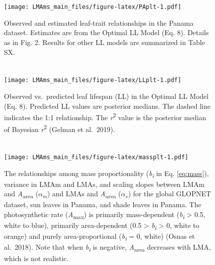 \documentclass[
  12pt,
]{article}
\begin{document}
\newpage

\hypertarget{section-3}{%
\section{}\label{section-3}}

\begin{figure}
\centering
\texttt{[image: LMAms\_main\_files/figure-latex/PAplt-1.pdf]}
\caption{\label{fig:PAplt}Observed and estimated leaf-trait relationships in the Panama dataset. Estimates are from the Optimal LL Model (Eq. 8). Details as in Fig. 2. Results for other LL models are summarized in Table SX.}
\end{figure}

\newpage

\hypertarget{section-4}{%
\section{}\label{section-4}}

\begin{figure}
\centering
\texttt{[image: LMAms\_main\_files/figure-latex/LLplt-1.pdf]}
\caption{\label{fig:LLplt}Observed vs.~predicted leaf lifespan (LL) in the Optimal LL Model (Eq. 8). Predicted LL values are posterior medians. The dashed line indicates the 1:1 relationship. The \emph{r}\textsuperscript{2} value is the posterior median of Bayesian \emph{r}\textsuperscript{2} (Gelman et al.~2019).}
\end{figure}

\newpage

\hypertarget{section-5}{%
\section{}\label{section-5}}

\begin{figure}
\centering
\texttt{[image: LMAms\_main\_files/figure-latex/massplt-1.pdf]}
\caption{\label{fig:massplt}The relationships among mass proportionality (\emph{b\textsubscript{i}} in Eq. \eqref{eq:mass}), variance in LMAm and LMAs, and scaling slopes between LMAm and \emph{A}\textsubscript{area} (\(\alpha_m\)) and LMAs and \emph{A}\textsubscript{area} (\(\alpha_s\)) for the global GLOPNET dataset, sun leaves in Panama, and shade leaves in Panama. The photosynthetic rate (\emph{A}\textsubscript{max}) is primarily mass-dependent (\emph{b\textsubscript{i}} \textgreater{} 0.5, white to blue), primarily area-dependent (0.5 \textgreater{} \emph{b\textsubscript{i}} \textgreater{} 0, white to orange) and purely area-proportional (\emph{b\textsubscript{i}} = 0, white) (Osnas et al.~2018). Note that when \emph{b\textsubscript{i}} is negative, \emph{A}\textsubscript{area} decreases with LMA, which is not realistic.}
\end{figure}
\end{document}
